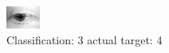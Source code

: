 \begin{figure}[h!]
\begin{center}
\includegraphics[width=0.60\columnwidth]{figures/ID2580_class_3_target_4.png}
\end{center}
\caption{ Classification: 3 actual target: 4}
\label{fig:ID2580_class_3_target_4}
\end{figure}
